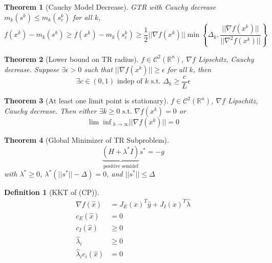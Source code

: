 \documentclass[a4paper]{article}
\newcommand{\R}{\mathbb{R}}
\newcommand{\C}{\mathcal{C}}
\newcommand{\st}{\text{ s.t. }}
\newcommand{\norm}[1]{\lvert \lvert #1 \rvert \rvert}
\newtheorem{theorem}{Theorem}
\newtheorem*{definition*}{Definition}
\begin{document}
\begin{theorem}[Cauchy Model Decrease]
    GTR with Cauchy decrease $m_k \left( s^k \right) \leq m_k \left( s_c^k \right)$ for all $k$,
    \begin{equation*}
        f\left( x^k \right) - m_k \left( s^k \right) \geq f \left( x^k \right) - m_k \left( s_c^k \right) \geq \frac{1}{2} \norm{\nabla f \left( x^k \right)} \min \left\{ \Delta_k, \frac{\norm{\nabla f \left( x^k \right)}}{\norm{\nabla^2 f \left( x^k \right)}} \right\}
    \end{equation*}
\end{theorem}

\begin{theorem}[Lower bound on TR radius]
    $f \in \C^2 \left( \R^n \right)$, $\nabla f$ Lipschitz, Cauchy decrease.
    Suppose $\exists \epsilon > 0$ such that $\norm{\nabla f \left( x^k \right)} \geq \epsilon$ for all $k$, then
    \begin{equation*}
        \exists c \in \left( 0, 1 \right) \text{ indep of } k \st \Delta_k \geq \frac{c}{L} \epsilon
    \end{equation*}
\end{theorem}

\begin{theorem}[At least one limit point is stationary]
    $f \in \C^2 \left( \R^n \right)$, $\nabla f$ Lipschitz, Cauchy decrease.
    Then either $\exists k \geq 0 \st \nabla f \left( x^k \right) = 0$ or
    \begin{equation*}
        {\lim \inf}_{k \rightarrow \infty} \norm{\nabla f \left( x^k \right)} = 0
    \end{equation*}
\end{theorem}

\begin{theorem}[Global Minimizer of TR Subproblem]
    \begin{equation*}
        \underbrace{\left( H + \lambda^* I \right)}_{\text{positive semidef}} s^{*} = -g
    \end{equation*}
    with $\lambda^* \geq 0$, $\lambda^* \left( \norm{s^*} - \Delta \right) = 0$, and $\norm{s^*} \leq \Delta$
\end{theorem}

\begin{definition*}[KKT of (CP)]
    \begin{align*}
        \nabla f \left( \hat x \right) &= J_E (x)^T \hat y + J_{I}(x)^T \hat \lambda \\
        c_E \left( \hat x \right) &= 0 \\
        c_I \left( \hat x \right) &\geq 0 \\
        \hat \lambda_i &\geq 0 \\
        \hat \lambda_i c_i \left( \hat x \right) &= 0
    \end{align*}
\end{definition*}
\end{document}
